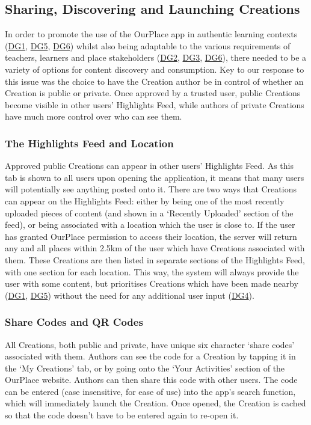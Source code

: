 \subsection{Sharing, Discovering and Launching Creations}
\label{sec:SharingActivities}

In order to promote the use of the OurPlace app in authentic learning contexts (\hyperref[DG1]{DG1}, \hyperref[DG5]{DG5}, \hyperref[DG6]{DG6}) whilst also being adaptable to the various requirements of teachers, learners and place stakeholders (\hyperref[DG2]{DG2}, \hyperref[DG3]{DG3}, \hyperref[DG6]{DG6}), there needed to be a variety of options for content discovery and consumption. Key to our response to this issue was the choice to have the Creation author be in control of whether an Creation is public or private. Once approved by a trusted user, public Creations become visible in other users' Highlights Feed, while authors of private Creations have much more control over who can see them. 

\subsubsection{The Highlights Feed and Location}
Approved public Creations can appear in other users' Highlights Feed. As this tab is shown to all users upon opening the application, it means that many users will potentially see anything posted onto it. There are two ways that Creations can appear on the Highlights Feed: either by being one of the most recently uploaded pieces of content (and shown in a `Recently Uploaded' section of the feed), or being associated with a location which the user is close to. If the user has granted OurPlace permission to access their location, the server will return any and all places within 2.5km of the user which have Creations associated with them. These Creations are then listed in separate sections of the Highlights Feed, with one section for each location. This way, the system will always provide the user with some content, but prioritises Creations which have been made nearby (\hyperref[DG1]{DG1}, \hyperref[DG5]{DG5}) without the need for any additional user input (\hyperref[DG4]{DG4}).

\subsubsection{Share Codes and QR Codes}
All Creations, both public and private, have unique six character `share codes' associated with them. Authors can see the code for a Creation by tapping it in the `My Creations' tab, or by going onto the `Your Activities' section of the OurPlace website. Authors can then share this code with other users. The code can be entered (case insensitive, for ease of use) into the app's search function, which will immediately launch the Creation. Once opened, the Creation is cached so that the code doesn't have to be entered again to re-open it. 


